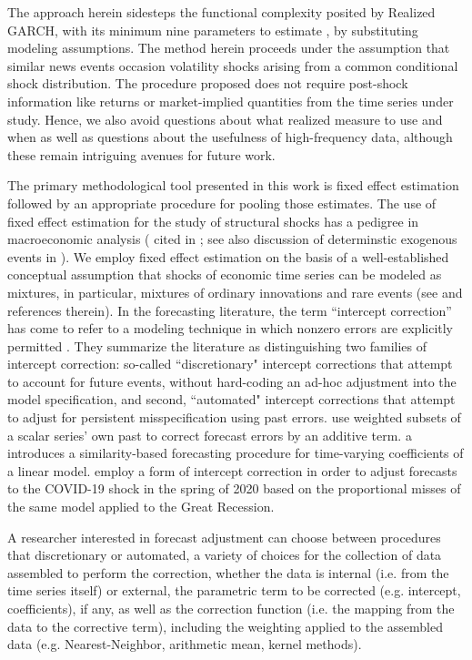 \documentclass[11pt,3p,review,authoryear]{elsarticle}
\theoremstyle{definition}
\begin{document}
The approach herein sidesteps the functional complexity posited by Realized GARCH, with its minimum nine parameters to estimate \citep{sharma2016forecasting}, by substituting modeling assumptions.  The method herein proceeds under the assumption that similar news events occasion volatility shocks arising from a common conditional shock distribution.  The procedure proposed does not require post-shock information like returns or market-implied quantities from the time series under study.  Hence, we also avoid questions about what realized measure to use and when as well as questions about the usefulness of high-frequency data, although these remain intriguing avenues for future work.

The primary methodological tool presented in this work is fixed effect estimation followed by an appropriate procedure for pooling those estimates.  The use of fixed effect estimation for the study of structural shocks has a pedigree in macroeconomic analysis (\citet{romer1989does} cited in \citet{kilian2017structural}; see also discussion of determinstic exogenous events in \citet{engle2001good}).  We employ fixed effect estimation on the basis of a well-established conceptual assumption that shocks of economic time series can be modeled as mixtures, in particular, mixtures of ordinary innovations and rare events (see \cite{phillips1996forecasting} and references therein).  In the forecasting literature, the term ``intercept correction'' has come to refer to a modeling technique in which nonzero errors are explicitly permitted \citep{hendry1994theory, clements1998forecasting}.  They summarize the literature as distinguishing two families of intercept correction: so-called ``discretionary" intercept corrections that attempt to account for future events, without hard-coding an ad-hoc adjustment into the model specification, and second, ``automated" intercept corrections that attempt to adjust for persistent misspecification using past errors.  \citet{guerron2017macroeconomic} use weighted subsets of a scalar series' own past to correct forecast errors by an additive term. \citet{dendramis2020similarity} a introduces a similarity-based forecasting procedure for time-varying coefficients of a linear model. \citet{foroni2022forecasting} employ a form of intercept correction in order to adjust forecasts to the COVID-19 shock in the spring of 2020 based on the proportional misses of the same model applied to the Great Recession.

A researcher interested in forecast adjustment can choose between procedures that discretionary or automated, a variety of choices for the collection of data assembled to perform the correction, whether the data is internal (i.e. from the time series itself) or external, the parametric term to be corrected (e.g. intercept, coefficients), if any, as well as the correction function (i.e. the mapping from the data to the corrective term), including the weighting applied to the assembled data (e.g. Nearest-Neighbor, arithmetic mean, kernel methods).
\end{document}
